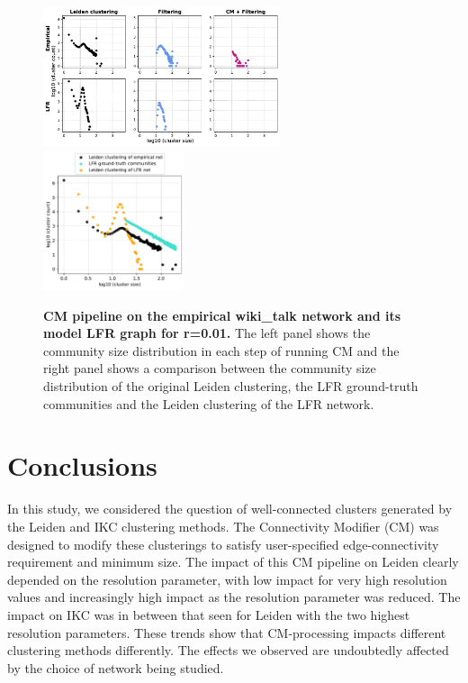\documentclass[11pt]{article}   	%
\begin{document}
\begin{figure}[h!]
\centering
\includegraphics[width=0.62\textwidth]{figs/wiki_talk_cm_steps_lfr01.pdf}
\includegraphics[width=0.37\textwidth]{figs/wiki_talk_01_cm_size.pdf}
\caption[CM pipeline on the Wikipedia talk network and its model LFR graph for r=0.01]{\textbf{CM pipeline on the empirical wiki\_talk network and its model LFR graph for r=0.01.} The left panel shows the community size distribution in each step of running CM and the right panel shows a comparison between the community size distribution of the original Leiden clustering, the LFR ground-truth communities and the Leiden clustering of the LFR network.}
\label{fig:wikitalk-cm-lfr-01}
\end{figure}

\section{Conclusions} 
In this study, we considered the question of well-connected clusters generated by the Leiden and IKC clustering methods. The Connectivity Modifier (CM) was designed to modify these clusterings to satisfy user-specified edge-connectivity requirement and minimum size.  The impact of this CM pipeline  on Leiden clearly depended on the resolution parameter, with low impact for very high resolution values and increasingly high impact as the resolution parameter was reduced.  The impact on IKC was in between that seen for Leiden with the two highest resolution parameters. These trends show that CM-processing impacts different clustering methods differently. The effects we observed are undoubtedly affected by the choice of network being studied.
\end{document}
